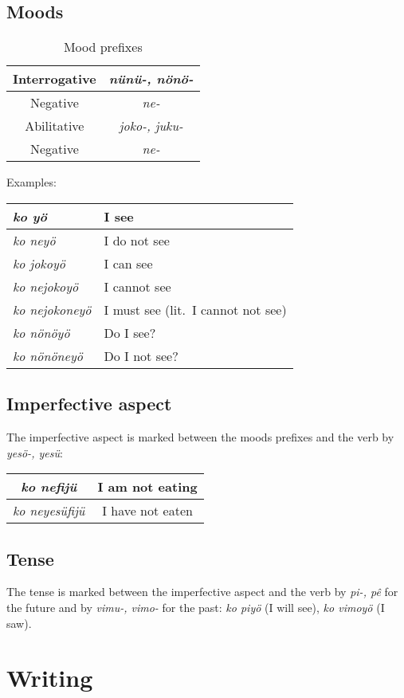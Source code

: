 \documentclass[a4paper]{article}
\begin{document}
\subsection{Moods}

\begin{table}[H]
\begin{tabular}{c | c}
Interrogative & \emph{n\"un\"u-, n\"on\"o-} \\
\hline
Negative & \emph{ne-} \\
\hline
Abilitative & \emph{joko-, juku-} \\
\hline
Negative & \emph{ne-}
\end{tabular}
\caption{Mood prefixes}
\end{table}

Examples:
\begin{table}[H]
\begin{tabular}{l | l}
\emph{ko y\"o} & I see \\
\hline
\emph{ko ney\"o} & I do not see \\
\hline
\emph{ko jokoy\"o} & I can see \\
\hline
\emph{ko nejokoy\"o} & I cannot see \\
\hline
\emph{ko nejokoney\"o} & I must see (lit.\ I cannot not see) \\
\hline
\emph{ko n\"on\"oy\"o} & Do I see? \\
\hline
\emph{ko n\"on\"oney\"o} & Do I not see?
\end{tabular}
\end{table}

\subsection{Imperfective aspect}

The imperfective aspect is marked between the moods prefixes and the verb by
\emph{yes\"o-, yes\"u}: 
\begin{tabular}{c | c}
\emph{ko nefij\"u} & I am not eating \\
\hline
\emph{ko neyes\"ufij\"u} & I have not eaten
\end{tabular} 

\subsection{Tense}

The tense is marked between the imperfective aspect and the verb by
\emph{pi-, p\^e} for the future and by \emph{vimu-, vimo-} for the past:
\emph{ko piy\"o} (I will see), \emph{ko vimoy\"o} (I saw).

\section{Writing}
\end{document}
